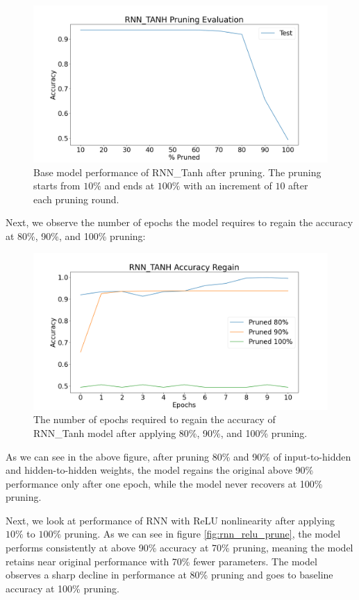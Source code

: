 \begin{figure}[h]
	\centering
	\includegraphics[width=0.8\linewidth]{images/results/pruning/rnn_tanh_pruning_evaluation.png}
	\caption[RNN\_Tanh base model performance after pruning]%
	{Base model performance of RNN\_Tanh after pruning. The pruning starts from $10\%$ and ends at $100\%$ with an increment of $10$ after each pruning round.}
	\label{fig:rnn_tanh_prune}
\end{figure}

Next, we observe the number of epochs the model requires to regain the accuracy at 80\%, 90\%, and 100\% pruning:

\begin{figure}[h]
	\centering
	\includegraphics[width=0.8\linewidth]{images/results/pruning/rnn_tanh_accuracy_regain.png}
	\caption[RNN\_Tanh base model performance regain after pruning]%
	{The number of epochs required to regain the accuracy of RNN\_Tanh model after applying 80\%, 90\%, and 100\% pruning.}
	\label{fig:rnn_tanh_prune_regain}
\end{figure}

As we can see in the above figure, after pruning 80\% and 90\% of input-to-hidden and hidden-to-hidden weights, the model regains the original above 90\% performance only after one epoch, while the model never recovers at 100\% pruning.

Next, we look at performance of RNN with ReLU nonlinearity after applying $10\%$ to $100\%$ pruning. As we can see in figure \ref{fig:rnn_relu_prune}, the model performs consistently at above 90\% accuracy at 70\% pruning, meaning the model retains near original performance with 70\% fewer parameters. The model observes a sharp decline in performance at 80\% pruning and goes to baseline accuracy at 100\% pruning.

